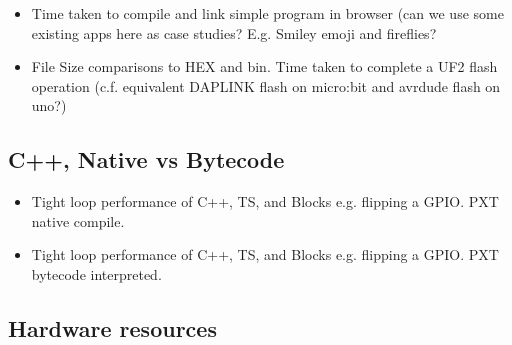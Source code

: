 \begin{itemize}
\item Time taken to compile and link simple program in browser (can we use some existing apps 
      here as case studies? E.g. Smiley emoji and fireflies?
\item \UF File Size comparisons to HEX and bin. Time taken to complete a UF2 flash operation 
    (c.f. equivalent DAPLINK flash on micro:bit and avrdude flash on uno?)
\end{itemize}

\subsection{C++, Native vs Bytecode}
\begin{itemize}
\item Tight loop performance of C++, TS, and Blocks e.g. flipping a GPIO. PXT native compile.
\item Tight loop performance of C++, TS, and Blocks e.g. flipping a GPIO. PXT bytecode interpreted.
\end{itemize}

\subsection{Hardware resources}



